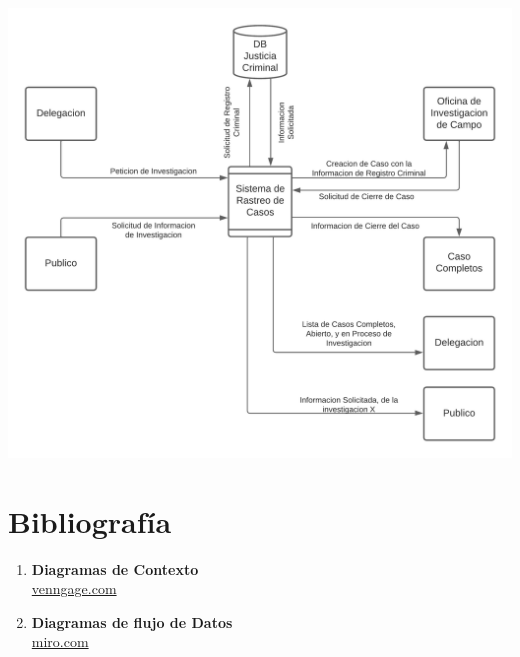 \documentclass[12pt]{article}
\begin{document}
\begin{center}
  {\includegraphics[width=0.65\linewidth]{imgs/Ejercicio2-DFD.png}\par}
\end{center}

\newpage
\section{Bibliografía}

\begin{enumerate}
   \item \textbf{Diagramas de Contexto}\\
        \href{https://es.venngage.com/blog/diagrama-de-contexto/}{venngage.com}

    \item \textbf{Diagramas de flujo de Datos}\\
        \href{https://miro.com/es/diagrama/que-es-diagrama-flujo-datos/}{miro.com}
\end{enumerate}
\end{document}
